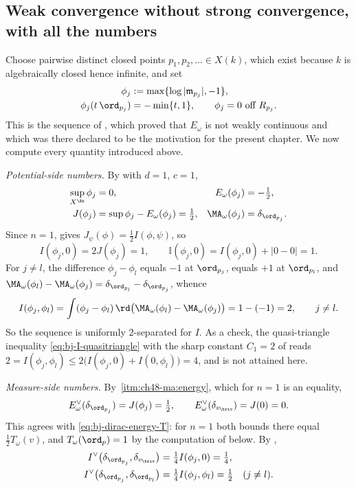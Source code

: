 \subsection{Weak convergence without strong convergence, with all the numbers}
\label{sec:ch48-ex-weak}

\begin{example}
\label{ex:ch48-weak-not-strong}
Choose pairwise distinct closed points $p_1,p_2,\dots\in X(k)$, which
exist because $k$ is algebraically closed hence infinite, and set
\[
 \begin{aligned}
 \phi_j&:=\max\{\log|\mathfrak m_{p_j}|,-1\},\\
 \phi_j(t\,\ord_{p_j})&=-\min\{t,1\},
 \qquad \phi_j=0\ \text{off}\ R_{p_j}.
 \end{aligned}
\]
This is the sequence of , which
proved that $E_\omega$ is not weakly continuous and which was there
declared to be the motivation for the present chapter.  We now compute
every quantity introduced above.

\emph{Potential-side numbers.}  By  with $d=1$,
$c=1$,
\[
 \begin{aligned}
 \sup_{X^{\An}}\phi_j&=0,&
 E_\omega(\phi_j)&=-\tfrac12,\\
 J(\phi_j)&=\sup\phi_j-E_\omega(\phi_j)=\tfrac12,&
 \MA_\omega(\phi_j)&=\delta_{\ord_{p_j}} .
 \end{aligned}
\]
Since $n=1$,  gives
$J_\psi(\phi)=\tfrac12I(\phi,\psi)$, so
\[
 I(\phi_j,0)=2J(\phi_j)=1,
 \qquad
 \mathbb I(\phi_j,0)=I(\phi_j,0)+|0-0|=1 .
\]
For $j\ne l$, the difference $\phi_j-\phi_l$ equals $-1$ at
$\ord_{p_j}$, equals $+1$ at $\ord_{p_l}$, and
$\MA_\omega(\phi_l)-\MA_\omega(\phi_j)
=\delta_{\ord_{p_l}}-\delta_{\ord_{p_j}}$, whence
\[
 I(\phi_j,\phi_l)=\int(\phi_j-\phi_l)\,
   \rd\bigl(\MA_\omega(\phi_l)-\MA_\omega(\phi_j)\bigr)
 =1-(-1)=2 ,
 \qquad j\ne l .
\]
So the sequence is uniformly $2$-separated for $I$.  As a check, the
quasi-triangle inequality \eqref{eq:bj-I-quasitriangle} with the sharp
constant $C_1=2$ of  reads
$2=I(\phi_j,\phi_l)\le2\bigl(I(\phi_j,0)+I(0,\phi_l)\bigr)=4$, and is not
attained here.

\emph{Measure-side numbers.}  By
\,\cref{itm:ch48-ma:energy}, which for
$n=1$ is an equality,
\[
 E^\vee_\omega(\delta_{\ord_{p_j}})=J(\phi_j)=\tfrac12,
 \qquad
 E^\vee_\omega(\delta_{v_{\triv}})=J(0)=0 .
\]
This agrees with \eqref{eq:bj-dirac-energy-T}: for $n=1$ both bounds
there equal $\tfrac12T_\omega(v)$, and $T_\omega(\ord_p)=1$ by the
computation of  below.  By
,
\[
 \begin{aligned}
 I^\vee\bigl(\delta_{\ord_{p_j}},\delta_{v_{\triv}}\bigr)
 &=\tfrac14I(\phi_j,0)=\tfrac14,\\
 I^\vee\bigl(\delta_{\ord_{p_j}},\delta_{\ord_{p_l}}\bigr)
 &=\tfrac14I(\phi_j,\phi_l)=\tfrac12\quad(j\ne l).
 \end{aligned}
\]


\end{example}
